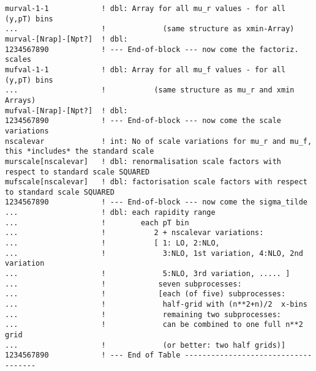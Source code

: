 {\begin{verbatim}
murval-1-1            ! dbl: Array for all mu_r values - for all (y,pT) bins
...                   !             (same structure as xmin-Array)
murval-[Nrap]-[Npt?]  ! dbl:
1234567890            ! --- End-of-block --- now come the factoriz. scales
mufval-1-1            ! dbl: Array for all mu_f values - for all (y,pT) bins
...                   !           (same structure as mu_r and xmin Arrays)
mufval-[Nrap]-[Npt?]  ! dbl:
1234567890            ! --- End-of-block --- now come the scale variations
nscalevar             ! int: No of scale variations for mu_r and mu_f, this *includes* the standard scale
murscale[nscalevar]   ! dbl: renormalisation scale factors with respect to standard scale SQUARED
mufscale[nscalevar]   ! dbl: factorisation scale factors with respect to standard scale SQUARED
1234567890            ! --- End-of-block --- now come the sigma_tilde
...                   ! dbl: each rapidity range
...                   !        each pT bin
...                   !           2 + nscalevar variations:
...                   !           [ 1: LO, 2:NLO,
...                   !             3:NLO, 1st variation, 4:NLO, 2nd variation
...                   !             5:NLO, 3rd variation, ..... ]
...                   !            seven subprocesses:     
...                   !            [each (of five) subprocesses:
...                   !             half-grid with (n**2+n)/2  x-bins
...                   !             remaining two subprocesses: 
...                   !             can be combined to one full n**2 grid
...                   !             (or better: two half grids)]
1234567890            ! --- End of Table ------------------------------------
\end{verbatim}
}
